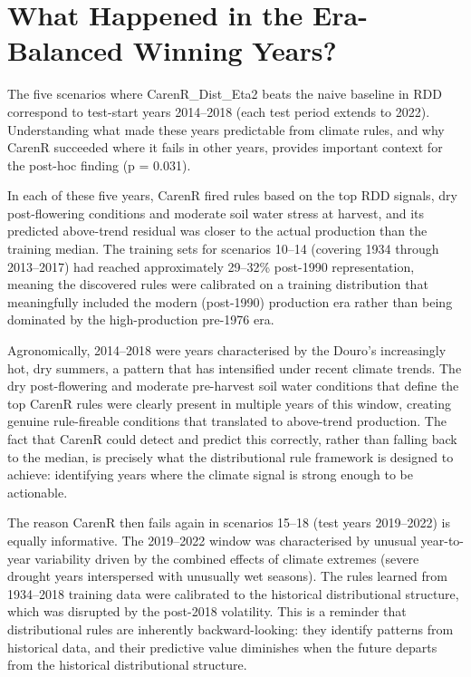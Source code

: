 \section{What Happened in the Era-Balanced Winning Years?}\label{sec:what_happened_in_the}

The five scenarios where CarenR\_Dist\_Eta2 beats the naive baseline in RDD correspond to test-start years 2014--2018 (each test period extends to 2022). Understanding what made these years predictable from climate rules, and why CarenR succeeded where it fails in other years, provides important context for the post-hoc finding (p = 0.031).

In each of these five years, CarenR fired rules based on the top RDD signals, dry post-flowering conditions and moderate soil water stress at harvest, and its predicted above-trend residual was closer to the actual production than the training median. The training sets for scenarios 10--14 (covering 1934 through 2013--2017) had reached approximately 29--32\% post-1990 representation, meaning the discovered rules were calibrated on a training distribution that meaningfully included the modern (post-1990) production era rather than being dominated by the high-production pre-1976 era.

Agronomically, 2014--2018 were years characterised by the Douro's increasingly hot, dry summers, a pattern that has intensified under recent climate trends. The dry post-flowering and moderate pre-harvest soil water conditions that define the top CarenR rules were clearly present in multiple years of this window, creating genuine rule-fireable conditions that translated to above-trend production. The fact that CarenR could detect and predict this correctly, rather than falling back to the median, is precisely what the distributional rule framework is designed to achieve: identifying years where the climate signal is strong enough to be actionable.

The reason CarenR then fails again in scenarios 15--18 (test years 2019--2022) is equally informative. The 2019--2022 window was characterised by unusual year-to-year variability driven by the combined effects of climate extremes (severe drought years interspersed with unusually wet seasons). The rules learned from 1934--2018 training data were calibrated to the historical distributional structure, which was disrupted by the post-2018 volatility. This is a reminder that distributional rules are inherently backward-looking: they identify patterns from historical data, and their predictive value diminishes when the future departs from the historical distributional structure.


